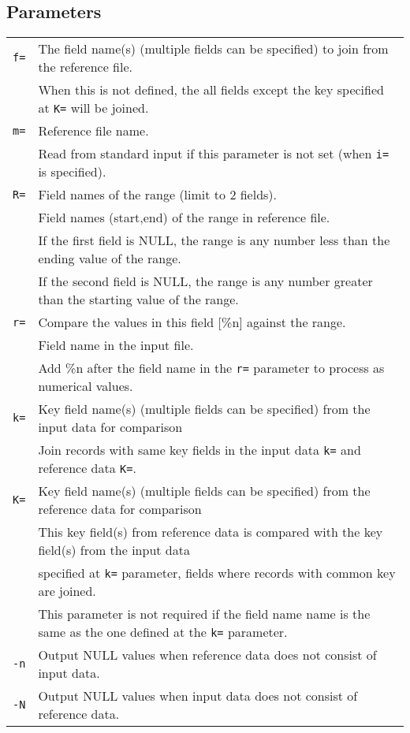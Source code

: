 \subsection*{Parameters}
\begin{table}[htbp]
{\small
\begin{tabular}{ll}
\verb|f=|    & The field name(s) (multiple fields can be specified) to join from the reference file. \\
             & When this is not defined, the all fields except the key specified at \verb|K=| will be joined. \\
\verb|m=|    & Reference file name.\\
             & Read from standard input if this parameter is not set (when \verb|i=| is specified). \\
\verb|R=|    & Field names of the range (limit to 2 fields). \\
             & Field names (start,end) of the range in reference file.  \\
             & If the first field is NULL, the range is any number less than the ending value of the range.\\
             & If the second field is NULL, the range is any number greater than the starting value of the range. \\
\verb|r=|    & Compare the values in this field [\%{n}] against the range.\\
             & Field name in the input file. \\
             & Add \%n after the field name in the \verb|r=| parameter to process as numerical values. \\
\verb|k=|    & Key field name(s) (multiple fields can be specified) from the input data for comparison  \\
             &  Join records with same key fields in the input data \verb|k=| and reference data \verb|K=|. \\
\verb|K=|    & Key field name(s) (multiple fields can be specified) from the reference data for comparison \\
             & This key field(s) from reference data is compared with the key field(s) from the input data \\
             & specified at \verb|k=| parameter, fields where records with common key are joined. \\
             & This parameter is not required if the field name name is the same as the one defined at the \verb|k=| parameter. \\
\verb|-n|    & Output NULL values when reference data does not consist of input data. \\
\verb|-N|    & Output NULL values when input data does not consist of reference data.\\
\end{tabular} 
}
\end{table} 

